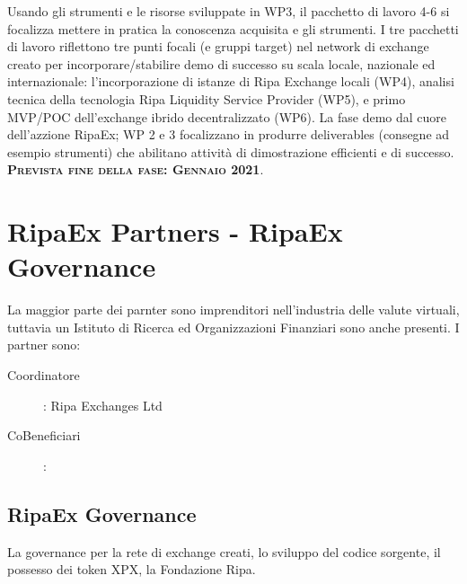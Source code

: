\documentclass[11pt,fleqn,oneside]{book} %
\begin{document}
\begin{center}
\resizebox{0.05\textwidth}{26pt}{$\Downarrow$}

\begin{tcolorbox}[roadmapBox,
	title=\textbf{\textsc{Sviluppo di un exchange ibrido-decentralizzato (WP 4-6)}}]

	Usando gli strumenti e le risorse sviluppate in WP3, il pacchetto di lavoro 4-6
	si focalizza mettere in pratica la conoscenza acquisita e gli strumenti. I tre
	pacchetti di lavoro riflettono tre punti focali (e gruppi target) nel network di 
	exchange creato per incorporare/stabilire demo di successo su scala locale, nazionale ed internazionale:
	l'incorporazione di istanze di Ripa Exchange locali (WP4), analisi tecnica della tecnologia
	Ripa Liquidity Service Provider (WP5), e primo MVP/POC dell'exchange ibrido decentralizzato (WP6).
	La fase demo dal cuore dell'azzione RipaEx; WP 2 e 3 focalizzano in produrre deliverables (consegne ad esempio
	strumenti) che abilitano attività di dimostrazione efficienti e di successo.\\
	\vspace{1cm}
	\centering\textbf{\textsc{Prevista fine della fase: Gennaio 2021}}.
\end{tcolorbox}
\end{center}

\section{RipaEx Partners - RipaEx Governance}
La maggior parte dei parnter sono imprenditori nell'industria delle valute virtuali, tuttavia
un Istituto di Ricerca ed Organizzazioni Finanziari sono anche presenti. I partner sono:
\begin{description}
	\item[Coordinatore]: Ripa Exchanges Ltd
	\item[CoBeneficiari]: 
\end{description}
\subsection{RipaEx Governance}
La governance per la rete di exchange creati, lo sviluppo del codice sorgente, il possesso dei token XPX, la Fondazione Ripa.
\end{document}
